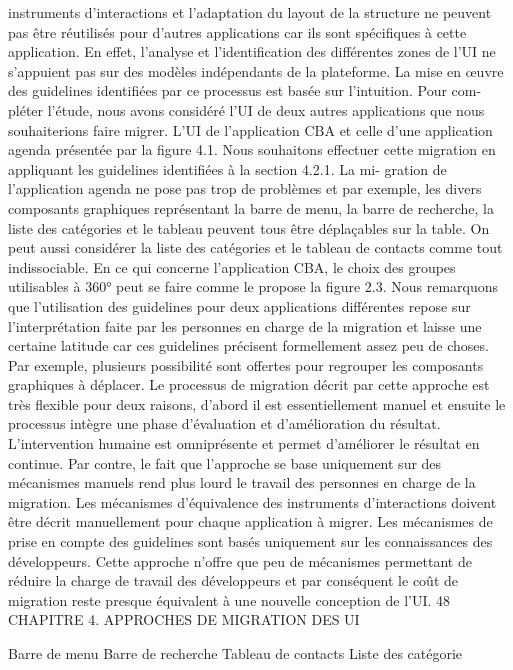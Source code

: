 \documentclass{article}
\begin{document}
instruments d’interactions et l’adaptation du layout de la structure ne peuvent pas être réutilisés pour
d’autres applications car ils sont spéciﬁques à cette application. En effet, l’analyse et l’identiﬁcation
des différentes zones de l’UI ne s’appuient pas sur des modèles indépendants de la plateforme.
La mise en œuvre des guidelines identiﬁées par ce processus est basée sur l’intuition. Pour com-
pléter l’étude, nous avons considéré l’UI de deux autres applications que nous souhaiterions faire
migrer. L’UI de l’application CBA et celle d’une application agenda présentée par la ﬁgure 4.1. Nous
souhaitons effectuer cette migration en appliquant les guidelines identiﬁées à la section 4.2.1. La mi-
gration de l’application agenda ne pose pas trop de problèmes et par exemple, les divers composants
graphiques représentant la barre de menu, la barre de recherche, la liste des catégories et le tableau
peuvent tous être déplaçables sur la table. On peut aussi considérer la liste des catégories et le tableau
de contacts comme tout indissociable. En ce qui concerne l’application CBA, le choix des groupes
utilisables à 360° peut se faire comme le propose la ﬁgure 2.3. Nous remarquons que l’utilisation
des guidelines pour deux applications différentes repose sur l’interprétation faite par les personnes
en charge de la migration et laisse une certaine latitude car ces guidelines précisent formellement
assez peu de choses. Par exemple, plusieurs possibilité sont offertes pour regrouper les composants
graphiques à déplacer.
Le processus de migration décrit par cette approche est très ﬂexible pour deux raisons, d’abord il
est essentiellement manuel et ensuite le processus intègre une phase d’évaluation et d’amélioration du
résultat. L’intervention humaine est omniprésente et permet d’améliorer le résultat en continue.
Par contre, le fait que l’approche se base uniquement sur des mécanismes manuels rend plus lourd
le travail des personnes en charge de la migration. Les mécanismes d’équivalence des instruments
d’interactions doivent être décrit manuellement pour chaque application à migrer. Les mécanismes de
prise en compte des guidelines sont basés uniquement sur les connaissances des développeurs. Cette
approche n’offre que peu de mécanismes permettant de réduire la charge de travail des développeurs
et par conséquent le coût de migration reste presque équivalent à une nouvelle conception de l’UI.
48
CHAPITRE 4. APPROCHES DE MIGRATION DES UI
 
 
Barre de menu
Barre de recherche
Tableau de contacts
Liste des catégorie
 
\end{document}

